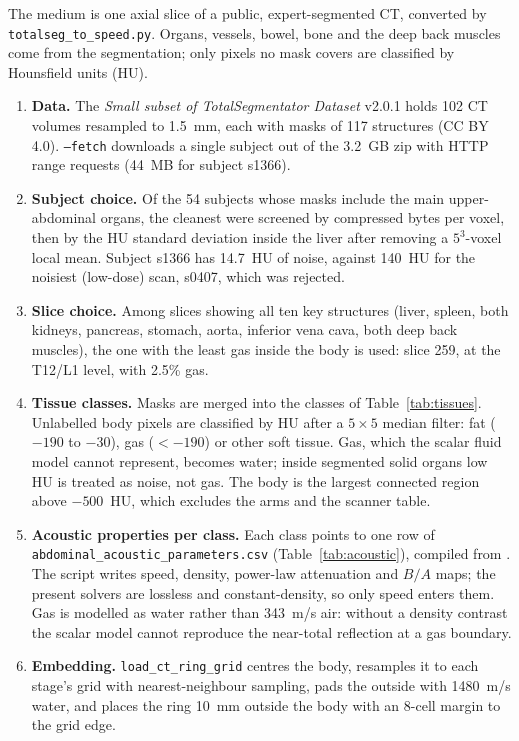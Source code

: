 \documentclass[11pt]{article}
\newcommand{\code}[1]{\texttt{#1}}
\begin{document}
The medium is one axial slice of a public, expert-segmented CT, converted by
\code{totalseg\_to\_speed.py}. Organs, vessels, bowel, bone and the deep back
muscles come from the segmentation; only pixels no mask covers are classified
by Hounsfield units (HU).

\begin{enumerate}
  \item \textbf{Data.} The \emph{Small subset of TotalSegmentator Dataset}
    v2.0.1 \cite{totalseg_data, wasserthal2023} holds 102 CT volumes resampled to
    1.5~mm, each with masks of 117 structures (CC BY 4.0). \code{--fetch}
    downloads a single subject out of the 3.2~GB zip with HTTP range requests
    (44~MB for subject s1366).
  \item \textbf{Subject choice.} Of the 54 subjects whose masks include the
    main upper-abdominal organs, the cleanest were screened by compressed bytes per voxel,
    then by the HU standard deviation inside the liver after removing a
    $5^3$-voxel local mean. Subject s1366 has 14.7~HU of noise, against 140~HU
    for the noisiest (low-dose) scan, s0407, which was rejected.
  \item \textbf{Slice choice.} Among slices showing all ten key structures
    (liver, spleen, both kidneys, pancreas, stomach, aorta, inferior vena cava,
    both deep back muscles), the one with the least gas inside the body is
    used: slice 259, at the T12/L1 level, with 2.5\% gas.
  \item \textbf{Tissue classes.} Masks are merged into the classes of
    Table~\ref{tab:tissues}. Unlabelled body pixels are classified by HU after
    a $5\times5$ median filter: fat ($-190$ to $-30$), gas ($<-190$) or other
    soft tissue. Gas, which the scalar fluid model cannot represent, becomes
    water; inside segmented solid organs low HU is treated as noise, not gas.
    The body is the largest connected region above $-500$~HU, which excludes
    the arms and the scanner table.
  \item \textbf{Acoustic properties per class.} Each class points to one row
    of \code{abdominal\_acoustic\_parameters.csv} (Table~\ref{tab:acoustic}),
    compiled from \cite{duck1990, szabo, mast2000}. The script writes speed,
    density, power-law attenuation and $B/A$ maps; the present solvers are
    lossless and constant-density, so only speed enters them. Gas is modelled
    as water rather than 343~m/s air: without a density contrast the scalar
    model cannot reproduce the near-total reflection at a gas boundary.
  \item \textbf{Embedding.} \code{load\_ct\_ring\_grid} centres the body,
    resamples it to each stage's grid with nearest-neighbour sampling, pads the
    outside with 1480~m/s water, and places the ring 10~mm outside the body
    with an 8-cell margin to the grid edge.
\end{enumerate}
\end{document}

